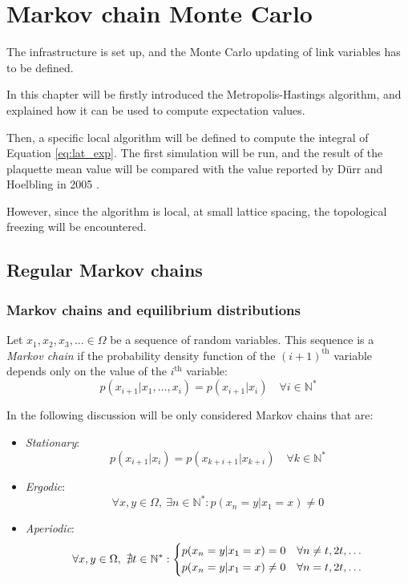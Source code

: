 \chapter{Markov chain Monte Carlo}\label{ch:mcmc}

The infrastructure is set up, and the Monte Carlo updating of link variables has to be defined.

In this chapter will be firstly introduced the Metropolis-Hastings algorithm,
and explained how it can be used to compute expectation values.

Then, a specific local algorithm will be defined to compute the integral of Equation \eqref{eq:lat_exp}.
The first simulation will be run,
and the result of the plaquette mean value will be compared with the value reported by D\"urr and Hoelbling in 2005 \cite{durr-hoelbling:2005}.

However, since the algorithm is local, at small lattice spacing, the topological freezing will be encountered.

\section{Regular Markov chains}

\subsection*{Markov chains and equilibrium distributions}
Let $x_1, x_2, x_3, \ldots \in \Omega$ be a sequence of random variables.
This sequence is a \emph{Markov chain} if the probability density function of the $(i+1)^\mathrm{th}$
variable depends only on the value of the $i^\mathrm{th}$ variable:
\[
    p(x_{i+1}|x_1, \ldots, x_i) = p(x_{i+1}|x_i) \quad \forall i\in\mathbb N^*
\]

In the following discussion will be only considered Markov chains that are:
\begin{itemize}
    \item \emph{Stationary}:
        \[
            p(x_{i+1}|x_i) = p(x_{k+i+1}|x_{k+i}) \quad \forall k\in\mathbb N^*
        \]
    \item \emph{Ergodic}:
        \[
            \forall x,y \in \Omega,\ \exists n\in\mathbb N^* : p(x_n=y|x_1=x) \neq 0
        \]
    \item \emph{Aperiodic}:
        \[
            \forall x,y \in \Omega,\ \nexists t\in\mathbb N^* :
            \begin{dcases}
                p(x_n=y|x_1=x)=0 \quad \forall n\neq t,2t,\ldots \\
                p(x_n=y|x_1=x)\neq0 \quad \forall n=t,2t,\ldots
            \end{dcases}
        \]
\end{itemize}


